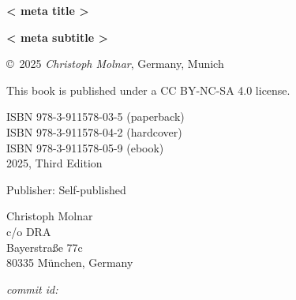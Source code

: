 \thispagestyle{empty}

\newcommand{\authorMail}{science-book@christophmolnar.com}
\newcommand{\authorAddress}{%

Christoph Molnar \\
c/o DRA \\
Bayerstraße 77c \\
80335 München, Germany \\
}
\newcommand{\isbn}{}
\newcommand{\edition}{Third Edition}
\newcommand{\publicationYear}{2025}

\thispagestyle{empty}
\begin{center}
  {
  \bfseries \sffamily \LARGE {{< meta title >}}\par
  \bfseries \small {{< meta subtitle >}}\par
}
\copyright~\publicationYear \textit{ Christoph Molnar}, Germany, Munich\\

\vspace*{\baselineskip}

This book is published under a CC BY-NC-SA 4.0 license.


ISBN 978-3-911578-03-5 (paperback) \\
ISBN 978-3-911578-04-2 (hardcover) \\
ISBN 978-3-911578-05-9 (ebook) \\

\publicationYear, \edition

\textsc{} 

Publisher: Self-published

\authorAddress

\vspace*{1cm}

\textit{commit id: }

\end{center}

\newpage
\thispagestyle{empty}
\mbox{}
\newpage

